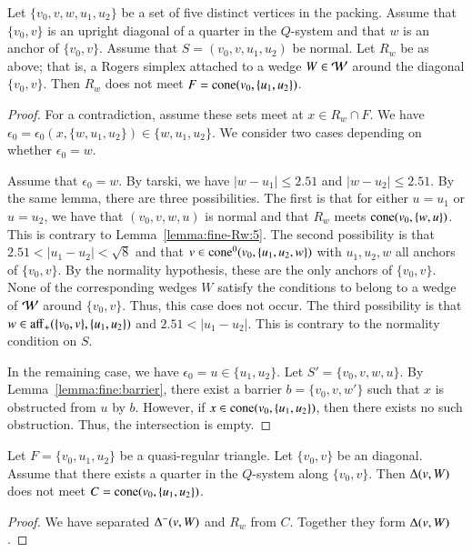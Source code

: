 \begin{lemma}\label{lemma:fine-Rw:5}
Let $\{v_0,v,w,u_1,u_2\}$ be a set of five distinct vertices in the
packing.  Assume that $\{v_0,v\}$ is an upright diagonal of a quarter
in the $Q$-system and that $w$ is an anchor of $\{v_0,v\}$.
Assume that $S=(v_0,v,u_1,u_2)$ be normal.
Let $R_w$ be as above; that is, a Rogers simplex attached to a wedge
$W\in {\mathcal W}$ around the diagonal $\{v_0,v\}$.
Then $R_w$ does not meet $F={\operatorname{cone}}(v_0,\{u_1,u_2\})$.
\end{lemma}

\begin{proof}
For a contradiction, assume these sets meet at $x\in R_w\cap F$.
We have $\epsilon_0=\epsilon_0(x,\{w,u_1,u_2\})\in\{w,u_1,u_2\}$.  We consider
two cases depending on whether $\epsilon_0=w$.

Assume that $\epsilon_0=w$.  By tarski,
we have $|w-u_1|\le 2.51$ and $|w-u_2|\le 2.51$.  By the same
lemma, 
there are three possibilities.  The first is that
for either $u=u_1$ or $u=u_2$, we have that $(v_0,v,w,u)$ is normal
and that $R_w$ meets ${\operatorname{cone}}(v_0,\{w,u\})$.  This is contrary to
Lemma~\ref{lemma:fine-Rw:5}.
The second possibility is that
$2.51<|u_1-u_2|<\sqrt8$ and that $v\in{\operatorname{cone}}^0(v_0,\{u_1,u_2,w\})$
with $u_1,u_2,w$ all anchors of $\{v_0,v\}$.  By the normality
hypothesis, these are the only anchors of $\{v_0,v\}$.  None of the
corresponding wedges $W$ satisfy the conditions to belong to
a wedge of ${\mathcal W}$ around $\{v_0,v\}$.  Thus, this case does not
occur. The third possibility is that $w\in {\operatorname{aff}}_+(\{v_0,v\},\{u_1,u_2\})$
and $2.51<|u_1-u_2|$.  This is contrary to the normality
condition on $S$.

In the remaining case, we have $\epsilon_0=u\in\{u_1,u_2\}$.  
Let $S'=\{v_0,v,w,u\}$.  By Lemma~\ref{lemma:fine:barrier}, there
exist a barrier $b=\{v_0,v,w'\}$ such that $x$ is obstructed from
$u$ by $b$.  However, if $x\in{\operatorname{cone}}(v_0,\{u_1,u_2\})$, then
there exists no such obstruction.  Thus, the intersection
is empty.
\end{proof}

\begin{lemma}\label{lemma:delta-tri}
Let $F=\{v_0,u_1,u_2\}$ be a quasi-regular triangle.  Let $\{v_0,v\}$ be
an diagonal. Assume that there
exists a quarter in the $Q$-system along $\{v_0,v\}$.  Then
$\Delta(v,W)$ does not meet $C={\operatorname{cone}}(v_0,\{u_1,u_2\})$.
\end{lemma}

\begin{proof}
We have separated $\Delta^-(v,W)$ and $R_w$ from $C$.
Together they form $\Delta(v,W)$.
\end{proof}






